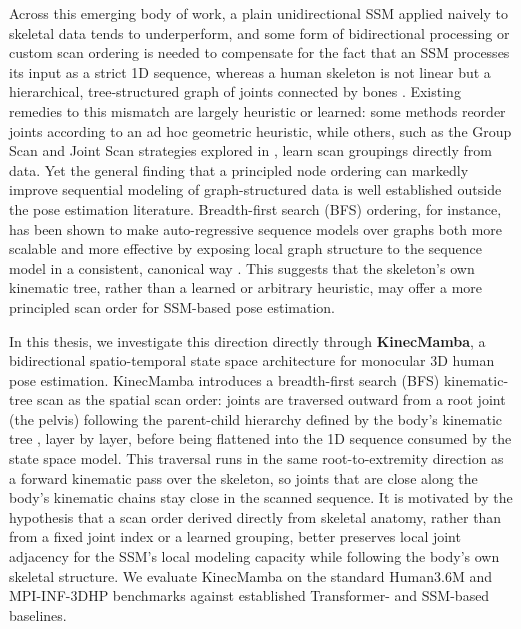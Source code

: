 Across this emerging body of work, a plain unidirectional SSM applied
naively to skeletal data tends to underperform, and some form of
bidirectional processing or custom scan ordering is needed to compensate
for the fact that an SSM processes its input as a
strict 1D sequence, whereas a human skeleton is not linear but a
hierarchical, tree-structured graph of joints connected by bones
\cite{yan2018stgcn, loper2015smpl}. Existing remedies to this mismatch are
largely heuristic or learned: some methods reorder joints according to an
ad hoc geometric heuristic, while others, such as the Group Scan and Joint
Scan strategies explored in \cite{nguyen2025skeletonmamba}, learn scan
groupings directly from data. Yet the general finding that a principled
node ordering can markedly improve sequential modeling of
graph-structured data is well established outside the pose estimation
literature. Breadth-first search (BFS) ordering, for instance, has been
shown to make auto-regressive sequence models over graphs both more
scalable and more effective by exposing local graph structure to the
sequence model in a consistent, canonical way \cite{you2018graphrnn}. This
suggests that the skeleton's own kinematic tree, rather than a learned or
arbitrary heuristic, may offer a more principled scan order for SSM-based
pose estimation.

In this thesis, we investigate this direction directly through
\textbf{KinecMamba}, a bidirectional spatio-temporal state space
architecture for monocular 3D human pose estimation. KinecMamba introduces
a breadth-first search (BFS) kinematic-tree scan as the spatial scan order:
joints are traversed outward from a root joint (the pelvis) following the
parent-child hierarchy defined by the body's kinematic tree
\cite{loper2015smpl}, layer by layer, before being flattened into the 1D
sequence consumed by the state space model. This traversal runs in the same
root-to-extremity direction as a forward kinematic pass over the skeleton,
so joints that are close along the body's kinematic chains stay close in the
scanned sequence. It is motivated by the hypothesis that a scan order derived
directly from skeletal anatomy, rather than from a fixed joint index or a
learned grouping, better preserves local joint adjacency for the SSM's local
modeling capacity while following the body's own skeletal structure. We
evaluate KinecMamba on the standard
Human3.6M \cite{ionescu2014human36m} and MPI-INF-3DHP
\cite{mehta2017mpiinf3dhp} benchmarks against established Transformer- and
SSM-based baselines.

